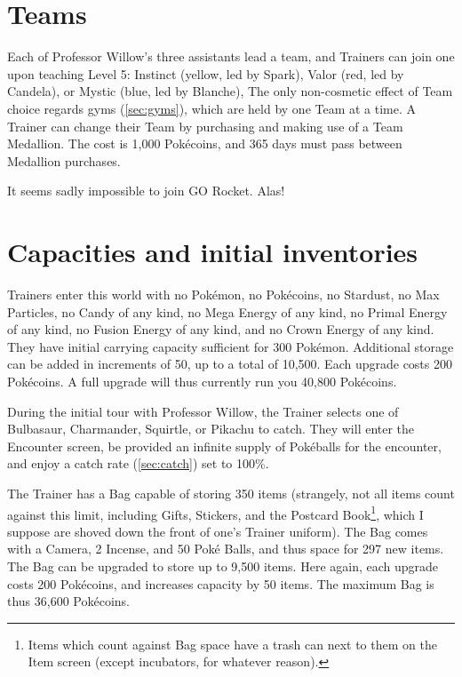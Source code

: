 \section{Teams}
Each of Professor Willow's three assistants lead a team, and Trainers can join one
 upon teaching Level 5: Instinct (yellow, led by Spark),
  Valor (red, led by Candela),
  or Mystic (blue, led by Blanche),
The only non-cosmetic effect of Team choice regards gyms (\autoref{sec:gyms}), which
  are held by one Team at a time.
A Trainer can change their Team by purchasing and making use of a Team Medallion.
The cost is 1,000 Pokécoins, and 365 days must pass between Medallion purchases.

It seems sadly impossible to join GO Rocket. Alas!

\section{Capacities and initial inventories\label{sec:capacities}}
Trainers enter this world with no Pokémon, no Pokécoins, no Stardust,
  no Max Particles, no Candy of any kind, no Mega Energy of any kind,
  no Primal Energy of any kind, no Fusion Energy of any kind, and no Crown
  Energy of any kind.
They have initial carrying capacity sufficient for 300 Pokémon.
Additional storage can be added in increments of 50, up to a total of 10,500.
Each upgrade costs 200 Pokécoins.
A full upgrade will thus currently run you 40,800 Pokécoins.

During the initial tour with Professor Willow, the Trainer selects one of
 Bulbasaur, Charmander, Squirtle, or Pikachu to catch.
They will enter the Encounter screen, be provided an infinite supply of
  Pokéballs for the encounter, and enjoy a catch rate (\autoref{sec:catch}) set to 100\%.

The Trainer has a Bag capable of storing 350 items (strangely, not all items
  count against this limit, including Gifts, Stickers, and the Postcard Book\footnote{Items which count against Bag space have a trash can next to them on the Item screen (except incubators, for whatever reason).},
  which I suppose are shoved down the front of one's Trainer uniform).
The Bag comes with a Camera, 2 Incense, and 50 Poké Balls,
  and thus space for 297 new items.
The Bag can be upgraded to store up to 9,500 items.
Here again, each upgrade costs 200 Pokécoins, and increases capacity by 50 items.
The maximum Bag is thus 36,600 Pokécoins.

